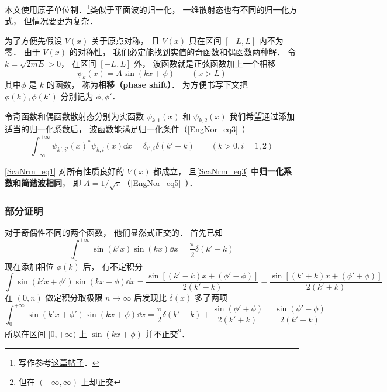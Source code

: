 
\begin{issues}
\issueDraft
\end{issues}

本文使用原子单位制．\footnote{写作参考\href{https://chaoli.club/index.php/4541/last}{这篇帖子}．}类似于平面波的归一化， 一维散射态也有不同的归一化方式， 但情况要更为复杂． 

为了方便先假设 $V(x)$ 关于原点对称， 且 $V(x)$ 只在区间 $[-L,L]$ 内不为零． 由于 $V(x)$ 的对称性， 我们必定能找到实值的奇函数和偶函数两种解． 令 $k = \sqrt{2mE} > 0$， 在区间 $[-L,L]$ 外， 波函数就是正弦函数加上一个相移
\begin{equation}\label{ScaNrm_eq3}
\psi_k(x) = A\sin(kx + \phi) \qquad (x > L)
\end{equation}
其中$\phi$ 是 $k$ 的函数， 称为\textbf{相移（phase shift）}． 为方便书写下文把 $\phi(k),\phi(k')$ 分别记为 $\phi, \phi'$．

令奇函数和偶函数散射态分别为实函数 $\psi_{k,1}(x)$ 和 $\psi_{k,2}(x)$ 我们希望通过添加适当的归一化系数后， 波函数能满足归一化条件（\autoref{EngNor_eq3}~）%
\begin{equation}\label{ScaNrm_eq1}
\int_{-\infty}^{+\infty} \psi_{k',i'}(x)^* \psi_{k,i}(x) \dd{x} = \delta_{i',i}\delta(k' - k) \qquad (k > 0, i = 1, 2)
\end{equation}

\begin{theorem}{}
\autoref{ScaNrm_eq1} 对所有性质良好的 $V(x)$ 都成立， 且\autoref{ScaNrm_eq3} 中\textbf{归一化系数和简谐波相同}， 即 $A = 1/\sqrt{\pi}$（\autoref{EngNor_eq5}~）．
\end{theorem}

\subsubsection{部分证明}
对于奇偶性不同的两个函数， 他们显然式正交的． 首先已知
\begin{equation}
\int_{0}^{+\infty} \sin(k'x)\sin(kx)\dd{x} = \frac{\pi}{2}\delta(k'-k)
\end{equation}
现在添加相位 $\phi(k)$ 后， 有不定积分
\begin{equation}
\int \sin(k'x+\phi')\sin(kx+\phi) \dd{x} = \frac{\sin[(k'-k)x + (\phi'-\phi)]}{2(k'-k)}
- \frac{\sin[(k'+k)x+(\phi'+\phi)]}{2(k'+k)}
\end{equation}
在 $(0,n)$ 做定积分取极限 $n\to\infty$ 后发现比 $\delta(x)$ 多了两项
\begin{equation}
\int_{0}^{+\infty} \sin(k'x+\phi')\sin(kx+\phi) \dd{x} = \frac{\pi}{2}\delta(k'-k)
+ \frac{\sin(\phi'+\phi)}{2(k'+k)} - \frac{\sin(\phi'-\phi)}{2(k'-k)}
\end{equation}
所以在区间 $[0, +\infty)$ 上 $\sin(kx+\phi)$ 并不正交\footnote{但在 $(-\infty,\infty)$ 上却正交}．

